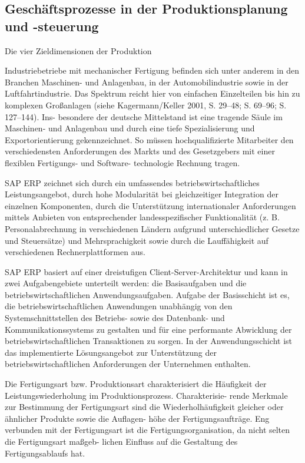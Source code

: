\subsection{Geschäftsprozesse in der Produktionsplanung und -steuerung}

 Die vier Zieldimensionen der Produktion\cite{Erlach.2010}

Industriebetriebe mit mechanischer Fertigung befinden sich unter anderem in den Branchen Maschinen- und Anlagenbau, in der Automobilindustrie sowie in der Luftfahrtindustrie. Das Spektrum reicht hier von einfachen Einzelteilen bis hin zu komplexen Großanlagen (siehe Kagermann/Keller 2001, S. 29–48; S. 69–96; S. 127–144). Ins- besondere der deutsche Mittelstand ist eine tragende Säule im Maschinen- und Anlagenbau und durch eine tiefe Spezialisierung und Exportorientierung gekennzeichnet. So müssen hochqualifizierte Mitarbeiter den verschiedensten Anforderungen des Markts und des Gesetzgebers mit einer flexiblen Fertigungs- und Software- technologie Rechnung tragen.

SAP ERP zeichnet sich durch ein umfassendes betriebswirtschaftliches Leistungsangebot, durch hohe Modularität bei gleichzeitiger Integration der einzelnen Komponenten, durch die Unterstützung internationaler Anforderungen mittels Anbieten von entsprechender landesspezifischer Funktionalität (z. B. Personalabrechnung in verschiedenen Ländern aufgrund unterschiedlicher Gesetze und Steuersätze) und Mehrsprachigkeit sowie durch die Lauffähigkeit auf verschiedenen Rechnerplattformen aus.

SAP ERP basiert auf einer dreistufigen Client-Server-Architektur und kann in zwei Aufgabengebiete unterteilt werden: die Basisaufgaben und die betriebswirtschaftlichen Anwendungsaufgaben. Aufgabe der Basisschicht ist es, die betriebswirtschaftlichen Anwendungen unabhängig von den Systemschnittstellen des Betriebs- sowie des Datenbank- und Kommunikationssystems zu gestalten und für eine performante Abwicklung der betriebswirtschaftlichen Transaktionen zu sorgen. In der Anwendungsschicht ist das implementierte Lösungsangebot zur Unterstützung der betriebswirtschaftlichen Anforderungen der Unternehmen enthalten.

Die Fertigungsart bzw. Produktionsart charakterisiert die Häufigkeit der Leistungswiederholung im Produktionsprozess. Charakterisie- rende Merkmale zur Bestimmung der Fertigungsart sind die Wiederholhäufigkeit gleicher oder ähnlicher Produkte sowie die Auflagen- höhe der Fertigungsaufträge. Eng verbunden mit der Fertigungsart ist die Fertigungsorganisation, da nicht selten die Fertigungsart maßgeb- lichen Einfluss auf die Gestaltung des Fertigungsablaufs hat. 


